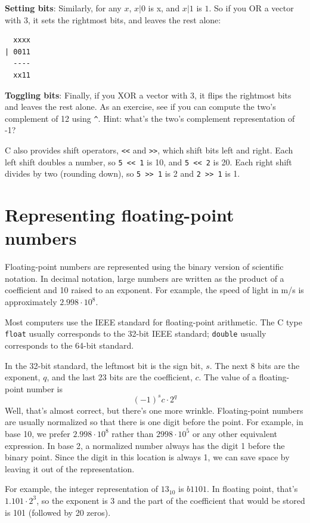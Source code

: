 \documentclass[12pt]{book}
\begin{document}
{{\bf Setting bits}: Similarly, for any $x$, $x | 0$ is x, and $x | 1$ is $1$.
So if you OR a vector with 3, it sets the rightmost
bits, and leaves the rest alone:
%
\begin{verbatim}
  xxxx
| 0011
  ----
  xx11
\end{verbatim}
%
{\bf Toggling bits}: Finally, if you XOR a vector with 3, it flips the
rightmost bits and leaves the rest alone.  As an exercise, see if you
can compute the two's complement of 12 using \verb"^".  Hint: what's
the two's complement representation of -1?


C also provides shift operators, {\tt <<} and {\tt >>}, which shift
bits left and right.  Each left shift doubles a number, so
{\tt 5 << 1} is 10, and {\tt 5 << 2} is 20.  Each right shift
divides by two (rounding down), so {\tt 5 >> 1} is 2 and
{\tt 2 >> 1} is 1.


\section{Representing floating-point numbers}

Floating-point numbers are represented using the binary
version of scientific notation.  In decimal notation, large
numbers are written as the product of a coefficient and 10 raised
to an exponent.  For example, the speed of light in m/s is
approximately $2.998 \cdot 10^8$.

Most computers use the IEEE standard for floating-point
arithmetic.  The C type {\tt float} usually corresponds
to the 32-bit IEEE standard; {\tt double} usually corresponds
to the 64-bit standard.

In the 32-bit standard, the leftmost bit is the sign bit, $s$.
The next 8 bits are the exponent, $q$, and the last 23 bits are
the coefficient, $c$.  The value of a floating-point number is
%
\[ (-1)^s c \cdot 2^q \]
%
Well, that's almost correct, but there's one more wrinkle.
Floating-point numbers are usually normalized so that there is
one digit before the point.  For example, in base 10, we prefer
$2.998 \cdot 10^8$ rather than $2998 \cdot 10^5$ or any other
equivalent expression.  In base 2, a normalized number always
has the digit 1 before the binary point.  Since the digit in
this location is always 1, we can save space by leaving it
out of the representation.

For example, the integer representation of $13_{10}$ is $b1101$.
In floating point, that's $1.101 \cdot 2^3$, so the exponent
is 3 and the part of the coefficient that would be stored
is 101 (followed by 20 zeros).

}
\end{document}
